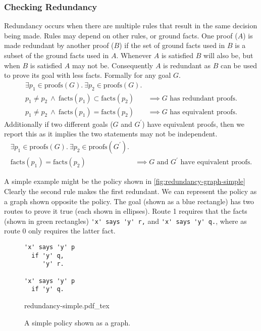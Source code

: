 \documentclass[a4paper]{scrartcl}
\begin{document}
\subsubsection{Checking Redundancy}

Redundancy occurs when there are multiple rules that result in the same decision being
made.  Rules may depend on other rules, or ground facts.  One proof ($A$) is made
redundant by another proof ($B$) if the set of ground facts used in $B$ is a
subset of the ground facts used in $A$. Whenever $A$ is satisfied $B$ will also
be, but when $B$ is satisfied $A$ may not be.  Consequently $A$ is redundant as
$B$ can be used to prove its goal with less facts.
Formally for any goal $G$.
\begin{align*}
  \exists p_1 \in \text{proofs}(G).~\exists p_2 \in \text{proofs}(G).&\\
  p_1 \not= p_2~\wedge~\text{facts}(p_1) \subset \text{facts}(p_2)&\implies G\text{ has redundant proofs.} \\
  p_1 \not= p_2~\wedge~\text{facts}(p_1) = \text{facts}(p_2)&\implies G\text{ has equivalent proofs.}
\end{align*}
Additionally if two different goals ($G$ and $G^\prime$) have equivalent proofs, then we report this
as it implies the two statements may not be independent.
\begin{align*}
  \exists p_1 \in \text{proofs}(G).~\exists p_2 \in \text{proofs}(G^\prime).&\\
  \text{facts}(p_1) = \text{facts}(p_2)&\implies \text{$G$ and $G^\prime$ have equivalent proofs.}
\end{align*}


A simple example might be the policy shown in \autoref{fig:redundancy-graph-simple}
Clearly the second rule makes the first redundant.  We can represent the policy
as a graph shown opposite the policy.  The goal (shown as a blue rectangle) has two routes
to prove it true (each shown in ellipses).  Route 1 requires that the facts
(shown in green rectangles) \lstinline!'x' says 'y' r,! and
\lstinline!'x' says 'y' q.!, where as route 0 only requires the
latter fact.

\begin{figure}
  \centering
  \begin{minipage}{0.4\linewidth}
  \begin{lstlisting}
'x' says 'y' p
  if 'y' q,
     'y' r.

'x' says 'y' p
  if 'y' q.
  \end{lstlisting}
  \end{minipage}
  \begin{minipage}{0.59\linewidth}
    \scriptsize{}
    \def\svgwidth{\columnwidth}
    {redundancy-simple.pdf_tex}
  \end{minipage}
  \caption{A simple policy shown as a graph.}
  \label{fig:redundancy-graph-simple}
\end{figure}
\end{document}
